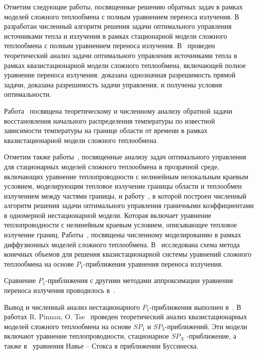Отметим следующие работы, посвященные решению обратных задач в
рамках моделей сложного теплообмена с полным уравнением переноса излучения.
В~\cite{end2010optimization} разработан численный алгоритм решения задачи оптимального управления
источниками тепла и излучения в рамках
стационарной модели сложного теплообмена с полным уравнением переноса излучения.
В~\cite{end2011analytical} проведен теоретический анализ задачи оптимального управления
источниками тепла в рамках квазистационарной модели сложного теплообмена, включающей полное уравнение
переноса излучения: доказана однозначная разрешимость прямой задачи,
доказана разрешимость задачи управления, и получены условия оптимальности.

Работа~\cite{amosov2010stationary} посвящена теоретическому и численному анализу обратной
задачи восстановления начального распределения температуры по известной
зависимости температуры на границе области от времени в рамках квазистационарной
модели сложного теплообмена.


Отметим также работы~\cite{birgelis2003optimal, meyer2006optimal, meyer2009state, Philip2010},
посвященные анализу задач оптимального управления для стационарных
моделей сложного теплообмена в прозрачной среде, включающих уравнение
теплопроводности с нелинейным
нелокальным краевым условием, моделирующим тепловое излучение границы
области и теплообмен излучением между частями границы, и работу~\cite{belmiloudi2014nonlinear},
в которой построен численный
алгоритм решения задачи оптимального управления граничными коэффициентами
в одномерной нестационарной модели.
Которая включает уравнение теплопроводности с нелинейным краевым условием,
описывающее тепловое излучение границ.
Работы~\cite{kovtanyuk2013iterative, Thommes2002, Pinnau2008, Siewert1991},
посвящены численному моделированию в рамках диффузионных
моделей сложного теплообмена.
В~\cite{gallouet2016analysis} исследована схема метода конечных объемов
для решения квазистационарной системы
уравнений сложного теплообмена на основе $P_1$-приближения уравнения переноса излучения.


Сравнение $P_1$-приближения с другими методами аппроксимации уравнения переноса излучения проводилось
в~\cite{modest2014elliptic, frank2011adaptive, kovtanyuk2012, Thommes2002, Larsen2002, Frank2007}.

Вывод и численный анализ нестационарного $P_1$-приближения выполнен в~\cite{
    Addam2015, olbrant2013asymptotic, frank2010optimal, frank2011adaptive, Frank2007
}.
В работах R. Pinnau, O. Tse~\cite{Pinnau2007, Pinnau2013} проведен теоретический
анализ квазистационарных моделей сложного теплообмена на основе $SP_1$ и $SP_3$-приближений.
Эти модели включают уравнение теплопроводности, стационарное $SP_N$ -приближение,
а также в~\cite{Pinnau2013} уравнения Навье – Стокса в приближении Буссинеска.


